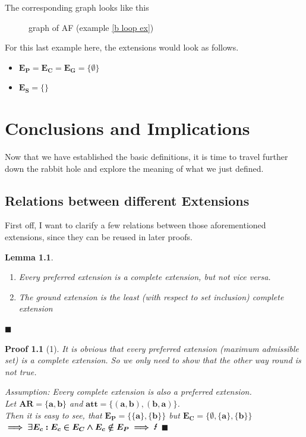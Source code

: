\documentclass[12pt]{report}
\numberwithin{figure}{chapter}
\theoremstyle{break}
\newtheorem{lem}{Lemma}[chapter]
\newtheorem*{prf}{Proof}
\newenvironment{mylem}{\begin{lem}}{$\blacksquare$ \end{lem}}
\newenvironment{myprf}{\begin{prf}}{$\blacksquare$ \end{prf}}
\begin{document}
The corresponding graph looks like this
\begin{figure}[h!]
\begin{center}\end{center}
\caption{graph of AF (example \ref{b loop ex})}
\end{figure}

For this last example here, the extensions would look as follows.
\begin{itemize}
	\item{$\bm{E_{P}=E_{C}=E_{G}=\{\emptyset\}}$}
	\item{$\bm{E_{S}=\{\}}$}
\end{itemize}

\chapter{Conclusions and Implications}

Now that we have established the basic definitions, it is time to travel further down the rabbit hole and explore the meaning of what we just defined.

\section{Relations between different Extensions}
First off, I want to clarify a few relations between those aforementioned extensions, since they can be reused in later proofs.

\begin{mylem}
\leavevmode\vspace{-\baselineskip}
\begin{enumerate}
	\item{Every preferred extension is a complete extension, but not vice versa.}
	\item{The ground extension is the least (with respect to set inclusion) complete extension}
\end{enumerate}
\end{mylem}

\begin{myprf}[1]
It is obvious that every preferred extension (maximum admissible set) is a complete extension. So we only need to show that the other way round is not true.

Assumption: Every complete extension is also a preferred extension.\\
Let $\bm{AR=\{a,b\}}$ and $\bm{att=\{(a,b),(b,a)\}}$.\\
Then it is easy to see, that $\bm{E_{P}=\{\{a\},\{b\}\}}$ but $\bm{E_{C}=\{\emptyset,\{a\},\{b\}\}}$\\
$\bm{\implies \exists E_{c}: E_{c} \in E_{C} \land E_{c} \notin E_{P} \implies \text{\Lightning}}$
\end{myprf}
\end{document}
